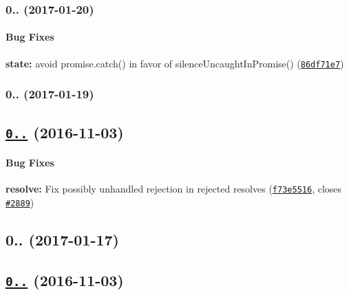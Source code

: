 \label{_0.4.2}%
 \subsubsection*{0.. (2017-\/01-\/20)}

\paragraph*{Bug Fixes}


\begin{DoxyItemize}
\item {\bfseries state\+:} avoid promise.\+catch() in favor of silence\+Uncaught\+In\+Promise() (\href{https://github.com/angular-ui/ui-router/commit/86df71e74bcf166847053a3c590991fc774f2100}{\tt 86df71e7})
\end{DoxyItemize}

\label{_0.4.1}%
 \subsubsection*{0.. (2017-\/01-\/19)}

\subsection*{\href{https://github.com/angular-ui/ui-router/compare/0.4.0...0.4.1}{\tt 0..} (2016-\/11-\/03)}

\paragraph*{Bug Fixes}


\begin{DoxyItemize}
\item {\bfseries resolve\+:} Fix \textquotesingle{}possibly unhandled rejection\textquotesingle{} in rejected resolves (\href{https://github.com/angular-ui/ui-router/commit/f73e5516d8232d8307690c70f53d4a20eb486479}{\tt f73e5516}, closes \href{https://github.com/angular-ui/ui-router/issues/2889}{\tt \#2889})
\end{DoxyItemize}

\label{_0.4.0}%
 \subsection*{0.. (2017-\/01-\/17)}

\subsection*{\href{https://github.com/angular-ui/ui-router/compare/0.3.2...0.4.0}{\tt 0..} (2016-\/11-\/03)}


